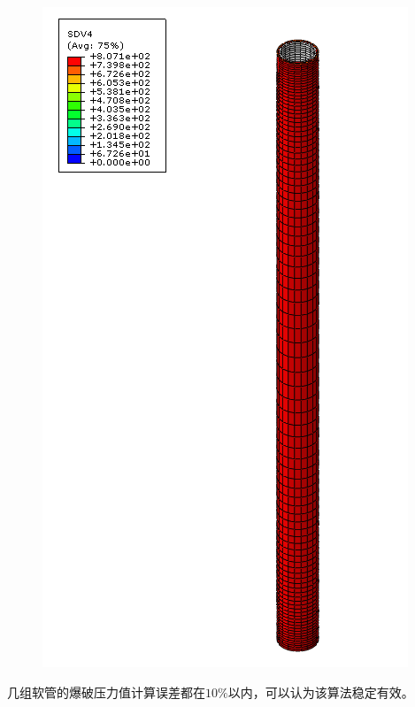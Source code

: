 \begin{figure}[!htp]
{		\includegraphics[height=0.33\textheight]{figure/chap6/2}
		\label{fig:chap6-2}
	}
	\label{fig:chap6-hose-burst}
\end{figure}


几组软管的爆破压力值计算误差都在$ 10\% $以内，可以认为该算法稳定有效。



